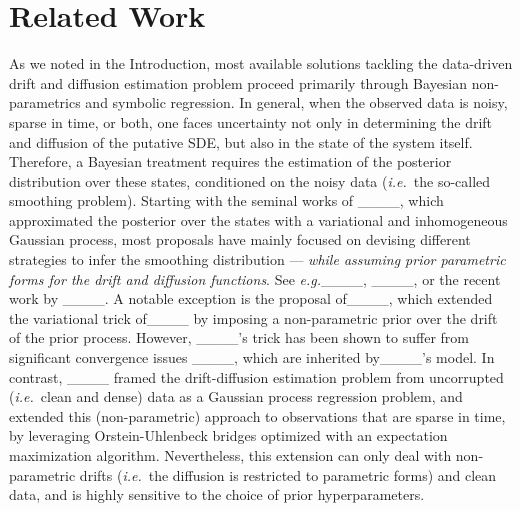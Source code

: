 \section{Related Work}
\label{sec:related-work}

As we noted in the Introduction, most available solutions tackling the 
data-driven drift and diffusion estimation problem proceed primarily through Bayesian non-parametrics and symbolic regression.
%
In general, when the observed data is noisy, sparse in time, or both, one faces uncertainty not only in determining the drift and diffusion of the putative SDE, but also in the state of the system itself.
%
Therefore, a Bayesian treatment requires the estimation of the posterior distribution over these states, conditioned on the noisy data (\textit{i.e.}~the so-called smoothing problem).
%
Starting with the seminal works of ____, which approximated the posterior over the states with a variational and inhomogeneous Gaussian process, 
most proposals have mainly focused on devising different strategies to infer the smoothing distribution --- \textit{while assuming prior parametric forms for the drift and diffusion functions}. See \textit{e.g.}____, ____, or the recent work by ____.
%
A notable exception is the proposal of____,  which extended the variational trick of____ by imposing a non-parametric prior over the drift of the prior process.
%
However, ____'s trick has been shown to suffer from significant convergence issues ____, which are inherited by____'s model.
%
In contrast, ____ framed the drift-diffusion estimation problem from uncorrupted (\textit{i.e.}~clean and dense) data as a Gaussian process regression problem,
%
and extended this (non-parametric) approach to observations that are sparse in time, by leveraging Orstein-Uhlenbeck bridges optimized with an expectation maximization algorithm.
%
Nevertheless, this extension can only deal with non-parametric drifts (\textit{i.e.}~the diffusion is restricted to parametric forms) and clean data, and is highly sensitive to the choice of prior hyperparameters.
%


